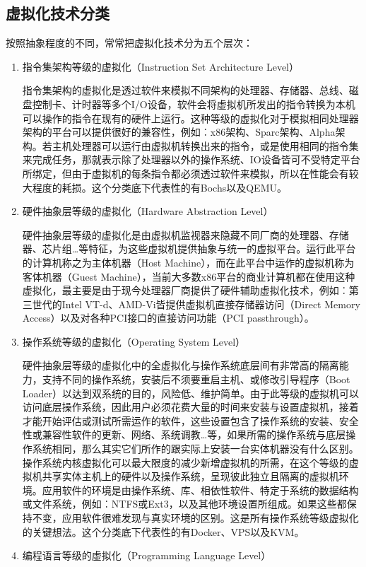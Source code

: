 \subsection{虚拟化技术分类}
按照抽象程度的不同，常常把虚拟化技术分为五个层次：
\begin{enumerate}
    \item 指令集架构等级的虚拟化（Instruction Set Architecture Level）

    指令集架构的虚拟化是透过软件来模拟不同架构的处理器、存储器、总线、磁盘控制卡、计时器等多个I/O设备，软件会将虚拟机所发出的指令转换为本机可以操作的指令在现有的硬件上运行。这种等级的虚拟化对于模拟相同处理器架构的平台可以提供很好的兼容性，例如︰x86架构、Sparc架构、Alpha架构。若主机处理器可以运行由虚拟机转换出来的指令，或是使用相同的指令集来完成任务，那就表示除了处理器以外的操作系统、IO设备皆可不受特定平台所绑定，但由于虚拟机的每条指令都必须透过软件来模拟，所以在性能会有较大程度的耗损。这个分类底下代表性的有Bochs以及QEMU。
    \item 硬件抽象层等级的虚拟化（Hardware Abstraction Level）

    硬件抽象层等级的虚拟化是由虚拟机监视器来隐藏不同厂商的处理器、存储器、芯片组…等特征，为这些虚拟机提供抽象与统一的虚拟平台。运行此平台的计算机称之为主体机器（Host Machine），而在此平台中运作的虚拟机称为客体机器（Guest Machine），当前大多数x86平台的商业计算机都在使用这种虚拟化，最主要是由于现今处理器厂商提供了硬件辅助虚拟化技术，例如︰第三世代的Intel VT-d、AMD-Vi皆提供虚拟机直接存储器访问（Direct Memory Access）以及对各种PCI接口的直接访问功能（PCI passthrough）。
    \item 操作系统等级的虚拟化（Operating System Level）

    硬件抽象层等级的虚拟化中的全虚拟化与操作系统底层间有非常高的隔离能力，支持不同的操作系统，安装后不须要重启主机、或修改引导程序（Boot Loader）以达到双系统的目的，风险低、维护简单。由于此等级的虚拟机可以访问底层操作系统，因此用户必须花费大量的时间来安装与设置虚拟机，接着才能开始评估或测试所需运作的软件，这些设置包含了操作系统的安装、安全性或兼容性软件的更新、网络、系统调教…等，如果所需的操作系统与底层操作系统相同，那么其实它们所作的跟实际上安装一台实体机器没有什么区别。操作系统内核虚拟化可以最大限度的减少新增虚拟机的所需，在这个等级的虚拟机共享实体主机上的硬件以及操作系统，呈现彼此独立且隔离的虚拟机环境。应用软件的环境是由操作系统、库、相依性软件、特定于系统的数据结构或文件系统，例如︰NTFS或Ext3，以及其他环境设置所组成。如果这些都保持不变，应用软件很难发现与真实环境的区别。这是所有操作系统等级虚拟化的关键想法。这个分类底下代表性的有Docker、VPS以及KVM。
    \item 编程语言等级的虚拟化（Programming Language Level）


\end{enumerate}
